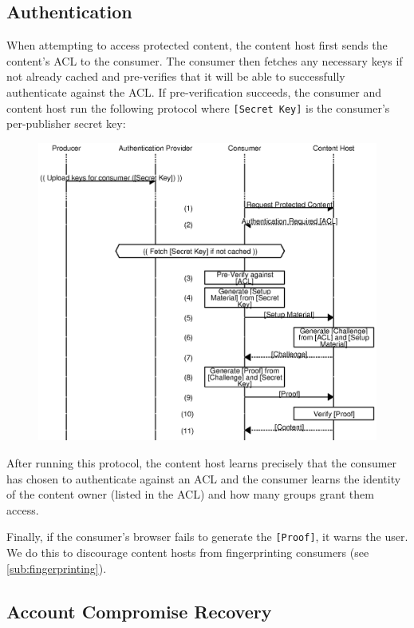 \documentclass[pdftex,12pt,a4papaer]{report}
\begin{document}
\subsection{Authentication}
\label{sub:authentication}

When attempting to access protected content, the content host first sends the
content's ACL to the consumer. The consumer then fetches any necessary keys if
not already cached and pre-verifies that it will be able to successfully
authenticate against the ACL. If pre-verification succeeds, the consumer and
content host run the following protocol where \verb=[Secret Key]= is the
consumer's per-publisher secret key:

\begin{figure}[H]
    \includegraphics{auth.eps}
\end{figure}

After running this protocol, the content host learns precisely that the consumer
has chosen to authenticate against an ACL and the consumer learns the identity
of the content owner (listed in the ACL) and how many groups grant them access.

Finally, if the consumer's browser fails to generate the \verb=[Proof]=, it
warns the user. We do this to discourage content hosts from fingerprinting
consumers (see \ref{sub:fingerprinting}).

\subsection{Account Compromise Recovery}
\end{document}

